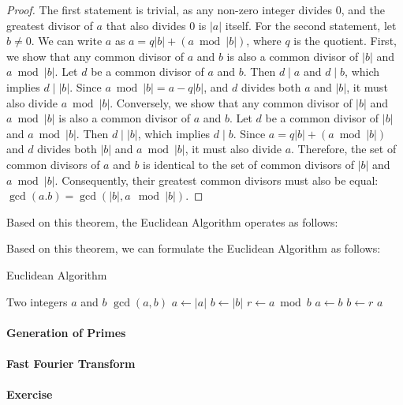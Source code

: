 \documentclass{article}
\begin{document}
\begin{proof}

The first statement is trivial, as any non-zero integer divides 0, and the greatest divisor of $a$ that also divides 0 is $|a|$ itself.
For the second statement, let $b \neq 0$. We can write $a$ as $a = q|b| + (a \bmod |b|)$, where $q$ is the quotient.
First, we show that any common divisor of $a$ and $b$ is also a common divisor of $|b|$ and $a \bmod |b|$. Let $d$ be a common divisor of $a$ and $b$. Then $d \mid a$ and $d \mid b$, which implies $d \mid |b|$. Since $a \bmod |b| = a - q|b|$, and $d$ divides both $a$ and $|b|$, it must also divide $a \bmod |b|$.
Conversely, we show that any common divisor of $|b|$ and $a \bmod |b|$ is also a common divisor of $a$ and $b$. Let $d$ be a common divisor of $|b|$ and $a \bmod |b|$. Then $d \mid |b|$, which implies $d \mid b$. Since $a = q|b| + (a \bmod |b|)$ and $d$ divides both $|b|$ and $a \bmod |b|$, it must also divide $a$.
Therefore, the set of common divisors of $a$ and $b$ is identical to the set of common divisors of $|b|$ and $a \bmod |b|$. Consequently, their greatest common divisors must also be equal: $\gcd(a. b) = \gcd(|b|, a \mod |b|)$.
\end{proof}

Based on this theorem, the Euclidean Algorithm operates as follows:

Based on this theorem, we can formulate the Euclidean Algorithm as follows:
\begin{algorithm}
\caption{Euclidean Algorithm}\label{alg:euclidean}
\begin{algorithmic}
\Require Two integers $a$ and $b$
\Ensure $\gcd(a, b)$
\State $a \gets |a|$
\State $b \gets |b|$
    \State $r \gets a \bmod b$
    \State $a \gets b$
    \State $b \gets r$
\EndWhile
\State \Return $a$ 
\end{algorithmic}
\end{algorithm}

\paragraph{Generation of Primes}

\paragraph{Fast Fourier Transform}

\paragraph{Exercise}
\end{document}
